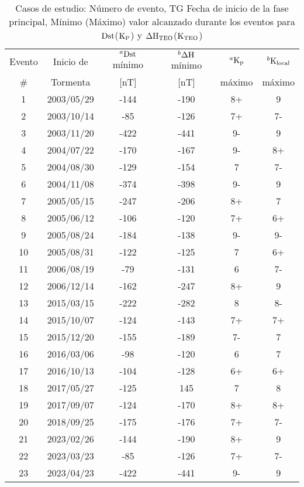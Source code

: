 \documentclass[preprint,12pt]{article}
\begin{document}
\begin{table*}[h!]
	\normalsize
	\centering
	\caption{Casos de estudio: Número de evento, TG Fecha de inicio de la fase principal, Mínimo (Máximo) valor alcanzado durante los eventos para ${\rm Dst}$(${\rm K_P}$) y ${\rm \Delta H_{TEO}}$(${\rm K_{TEO}}$)}
	\label{tab:1}
	\begin{tabular}{cccccc}
		\hline
		Evento & Inicio de & $^a {\rm Dst}$ mínimo
		& $^b{\rm \Delta H}$ mínimo
		& $^a{\rm K_p}$ & $^b {\rm K_{local}}$ \\
		\#    & Tormenta & [nT] & [nT] & máximo & máximo\\
		\hline
		1 & 2003/05/29 & -144 & -190 & 8+ & 9 \\ 
		2 & 2003/10/14 & -85 & -126 & 7+ & 7- \\ 
		3 & 2003/11/20 & -422 & -441 & 9- & 9 \\ 
		4 & 2004/07/22 & -170 & -167 & 9- & 8+ \\ 
		5 & 2004/08/30 & -129 & -154 & 7 & 7- \\ 
		6 & 2004/11/08 & -374 & -398 & 9- & 9 \\ 
		7 & 2005/05/15 & -247 & -206 & 8+ & 7 \\ 
		8 & 2005/06/12 & -106 & -120 & 7+ & 6+ \\ 
		9 & 2005/08/24 & -184 & -138 & 9- & 9- \\ 
		10 & 2005/08/31 & -122 & -125 & 7 & 6+ \\ 
		11 & 2006/08/19 & -79 & -131 & 6 & 7- \\ 
		12 & 2006/12/14 & -162 & -247 & 8+ & 9 \\ 
		13 & 2015/03/15 & -222 & -282 & 8 & 8- \\ 
		14 & 2015/10/07 & -124 & -143 & 7+ & 7+ \\ 
		15 & 2015/12/20 & -155 & -189 & 7- & 7 \\ 
		16 & 2016/03/06 & -98 & -120 & 6 & 7 \\ 
		17 & 2016/10/13 & -104 & -128 & 6+ & 6+ \\ 
		18 & 2017/05/27 & -125 & 145 & 7 & 8 \\ 
		19 & 2017/09/07 & -124 & -170 & 8+ & 8+ \\ 
		20 & 2018/09/25 & -175 & -176 & 7+ & 7- \\
		21 & 2023/02/26 & -144 & -190 & 8+ & 9 \\ 
		22 & 2023/03/23 & -85 & -126 & 7+ & 7- \\ 
		23 & 2023/04/23 & -422 & -441 & 9- & 9 \\ 		 
		\hline

\end{tabular}
\end{table*}
\end{document}
